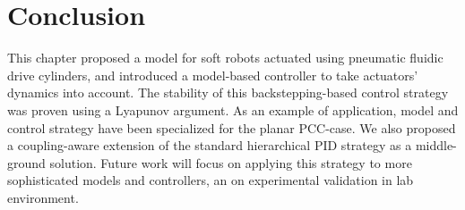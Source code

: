 \section{Conclusion}\label{sec:backstepping:conclusion}
%
This chapter proposed a model for soft robots actuated using pneumatic fluidic drive cylinders, and introduced a model-based controller to take actuators' dynamics into account. The stability of this backstepping-based control strategy was proven using a Lyapunov argument.  As an example of application, model and control strategy have been specialized for the planar \gls{PCC}-case. We also proposed a coupling-aware extension of the standard hierarchical PID strategy as a middle-ground solution. %
%
Future work will focus on applying this strategy to more sophisticated models and controllers, an on experimental validation in lab environment. %
